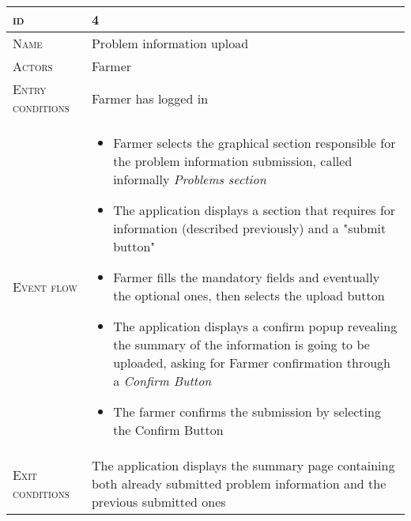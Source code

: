 \begin{table}[H]
    \centering
    \begin{tabular}{|l|p{}|}
        \hline %
    	\textsc{id}                 &   4\\
    	\hline %
    	\textsc{Name}               &   Problem information upload\\
    	\hline %
    	\textsc{Actors}             &   Farmer\\
    	\hline %
    	\textsc{Entry conditions}   &   Farmer has logged in\\
    	\hline %
    	\textsc{Event flow}         &   \footnotesize
            	                        \begin{itemize}
                                    	    \item Farmer selects the graphical section responsible for the problem information submission, called informally \textit{Problems section}
                                    		\item The application displays a section that requires for information (described previously) and a "submit button"
                                    		\item Farmer fills the mandatory fields and eventually the optional ones, then selects the upload button
                                    		\item The application displays a confirm popup revealing the summary of the information is going to be uploaded, asking for Farmer confirmation through a \textit{Confirm Button}
                                    		\item The farmer confirms the submission by selecting the Confirm Button
                                        \end{itemize}\\
        \hline %
        \textsc{Exit conditions}    &  The application displays the summary page containing both already submitted problem information and the previous submitted ones\\
    	\hline %

\end{tabular}
\end{table}

